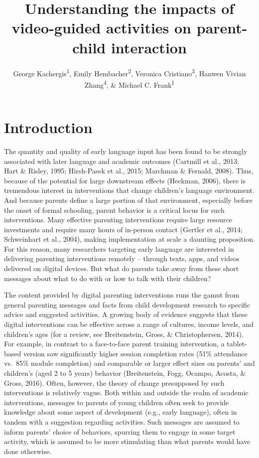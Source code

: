 \documentclass[man,floatsintext]{apa6}
\title{Understanding the impacts of video-guided activities on parent-child interaction}
\author{George Kachergis\textsuperscript{1}, Emily Hembacher\textsuperscript{2}, Veronica Cristiano\textsuperscript{3}, Hanwen Vivian Zhang\textsuperscript{4}, \& Michael C. Frank\textsuperscript{1}}
\date{}
\affiliation{
\vspace{0.5cm}
\textsuperscript{1} Department of Psychology, Stanford University\\\textsuperscript{2} Nextdoor, Inc.\\\textsuperscript{3} \\\textsuperscript{4} }
\begin{document}
\maketitle

\hypertarget{introduction}{%
\section{Introduction}\label{introduction}}

The quantity and quality of early language input has been found to be strongly associated with later language and academic outcomes (Cartmill et al., 2013; Hart \& Risley, 1995; Hirsh-Pasek et al., 2015; Marchman \& Fernald, 2008). Thus, because of the potential for large downstream effects (Heckman, 2006), there is tremendous interest in interventions that change children's language environment.
And because parents define a large portion of that environment, especially before the onset of formal schooling, parent behavior is a critical locus for such interventions.
Many effective parenting interventions require large resource investments and require many hours of in-person contact (Gertler et al., 2014; Schweinhart et al., 2004), making implementation at scale a daunting proposition.
For this reason, many researchers targeting early language are interested in delivering parenting interventions remotely -- through texts, apps, and videos delivered on digital devices.
But what do parents take away from these short messages about what to do with or how to talk with their children?

The content provided by digital parenting interventions runs the gamut from general parenting messages and facts from child development research to specific advice and suggested activities.
A growing body of evidence suggests that these digital interventions can be effective across a range of cultures, income levels, and children's ages (for a review, see Breitenstein, Gross, \& Christophersen, 2014).
For example, in contrast to a face-to-face parent training intervention, a tablet-based version saw significantly higher session completion rates (51\% attendance vs.~85\% module completion) and comparable or larger effect sizes on parents' and children's (aged 2 to 5 years) behavior (Breitenstein, Fogg, Ocampo, Acosta, \& Gross, 2016).
Often, however, the theory of change presupposed by such interventions is relatively vague.
Both within and outside the realm of academic interventions, messages to parents of young children often seek to provide knowledge about some aspect of development (e.g., early language), often in tandem with a suggestion regarding activities.
Such messages are assumed to inform parents' choice of behaviors, spurring them to engage in some target activity, which is assumed to be more stimulating than what parents would have done otherwise.
\end{document}
